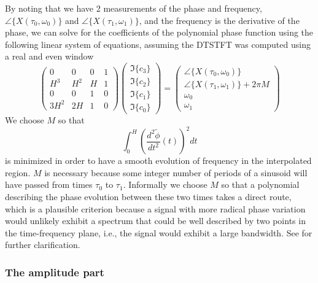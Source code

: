 By noting that we have 2 measurements of the phase and frequency,
$\angle\{X(\tau_0,\omega_0)\}$ and $\angle\{X(\tau_1,\omega_1)\}$, and the frequency
is the derivative of the phase, we can solve for the coefficients of the
polynomial phase function using the following linear system of equations,
assuming the DTSTFT was computed using a real and even window
\[
    \begin{pmatrix}
        0   & 0     & 0 & 1 \\
        H^3 & H^2   & H & 1 \\
        0   & 0     & 1 & 0 \\
        3 H^2 & 2 H & 1 & 0
    \end{pmatrix}
    \begin{pmatrix}
        \Im\{c_3\} \\
        \Im\{c_2\} \\
        \Im\{c_1\} \\
        \Im\{c_0\}
    \end{pmatrix}
    =
    \begin{pmatrix}
        \angle\{X(\tau_0,\omega_0)\} \\
        \angle\{X(\tau_1,\omega_1)\} + 2 \pi M \\
        \omega_0 \\
        \omega_1        
    \end{pmatrix}
\]
We choose $M$ so that
\begin{equation}
    \label{eq:minfmmq}
    \int_{0}^{H}(\frac{d^{2}\tilde{\phi}}{dt^2}(t))^{2}dt
\end{equation}
is minimized in order to have a smooth evolution of frequency in the interpolated
region. $M$ is necessary because some integer number of periods of a sinusoid
will have passed from times $\tau_{0}$ to $\tau_{1}$. Informally we choose $M$
so that a polynomial describing the phase evolution between these two times
takes a direct route, which is a plausible criterion because a signal with more
radical phase variation would unlikely exhibit a spectrum that could be well
described by two points in the time-frequency plane, i.e., the signal
would exhibit a large bandwidth. See \cite[p.~751]{mcaulay1986speech} for
further clarification.

\subsubsection{The amplitude part}

